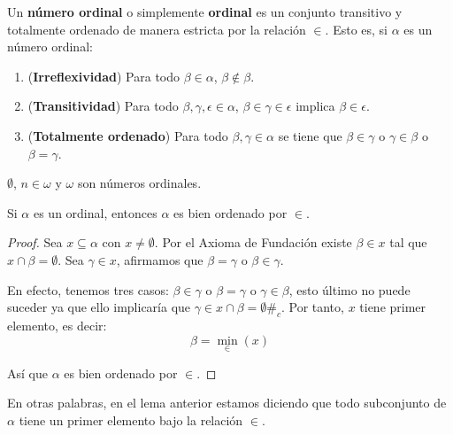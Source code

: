 \documentclass[12pt]{report}
\newcounter{it}
\theoremstyle{largebreak}
\newcommand\contradiction{\ensuremath{\#_c}}
\begin{document}
    \begin{mydef}
        Un \textbf{número ordinal} o simplemente \textbf{ordinal} es un conjunto transitivo y totalmente ordenado de manera estricta por la relación $\in$. Esto es, si $\alpha$ es un número ordinal:
        \begin{enumerate}[label = \textit{(\arabic*)}]
            \item (\textbf{Irreflexividad}) Para todo $\beta\in\alpha$, $\beta\notin\beta$.
            \item (\textbf{Transitividad}) Para todo $\beta,\gamma,\epsilon\in\alpha$, $\beta\in\gamma\in\epsilon$ implica $\beta\in\epsilon$.
            \item (\textbf{Totalmente ordenado}) Para todo $\beta,\gamma\in\alpha$ se tiene que $\beta\in\gamma$ o $\gamma\in\beta$ o $\beta=\gamma$.
        \end{enumerate}
    \end{mydef}

    \begin{exa}
        $\emptyset$, $n\in\omega$ y $\omega$ son números ordinales.
    \end{exa}

    \begin{lema}
        Si $\alpha$ es un ordinal, entonces $\alpha$ es bien ordenado por $\in$.
    \end{lema}

    \begin{proof}
        Sea $x\subseteq\alpha$ con $x\neq\emptyset$. Por el Axioma de Fundación existe $\beta\in x$ tal que $x\cap\beta=\emptyset$. Sea $\gamma\in x$, afirmamos que $\beta=\gamma$ o $\beta\in\gamma$.

        En efecto, tenemos tres casos: $\beta\in\gamma$ o $\beta=\gamma$ o $\gamma\in\beta$, esto último no puede suceder ya que ello implicaría que $\gamma\in x\cap\beta=\emptyset$\contradiction. Por tanto, $x$ tiene primer elemento, es decir:
        \begin{equation*}
            \beta=\min_{\in}(x)
        \end{equation*}

        Así que $\alpha$ es bien ordenado por $\in$.
    \end{proof}

    \begin{obs}
        En otras palabras, en el lema anterior estamos diciendo que todo subconjunto de $\alpha$ tiene un primer elemento bajo la relación $\in$.
    \end{obs}
\end{document}
